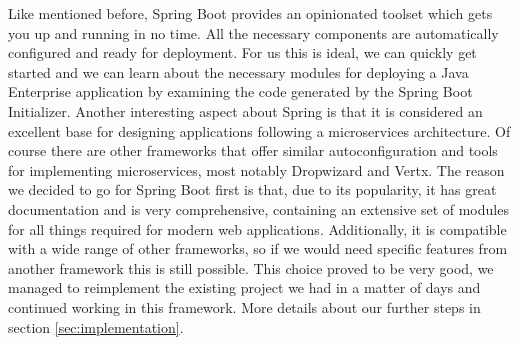 \documentclass[12pt]{article}
\begin{document}
\begin{multicols}{2}
Like mentioned before, Spring Boot provides an opinionated toolset which gets you up and running in no time. All the necessary components are automatically configured and ready for deployment. For us this is ideal, we can quickly get started and we can learn about the necessary modules for deploying a Java Enterprise application by examining the code generated by the Spring Boot Initializer. Another interesting aspect about Spring is that it is considered an excellent base for designing applications following a microservices architecture. \cite{SpringMicroservices35:online} \cite{MicroservicesFrameworks85:online} Of course there are other frameworks that offer similar autoconfiguration and tools for implementing microservices, most notably Dropwizard and Vertx. The reason we decided to go for Spring Boot first is that, due to its popularity, it has great documentation and is very comprehensive, containing an extensive set of modules for all things required for modern web applications. Additionally, it is compatible with a wide range of other frameworks, so if we would need specific features from another framework this is still possible. This choice proved to be very good, we managed to reimplement the existing project we had in a matter of days and continued working in this framework. More details about our further steps in section \ref{sec:implementation}.

\end{multicols}
\end{document}

